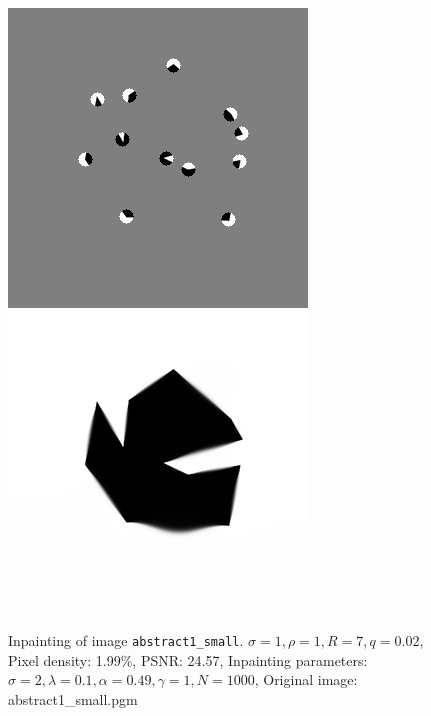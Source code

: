 \begin{figure}[ht]
    \centering
    \vspace*{0.2cm}
    \includegraphics[width=0.4\linewidth]{../Images/abstract/abstract1_small-mask_larger_radius.png}\hspace{0.2cm}
    \includegraphics[width=0.4\linewidth]{../Images/abstract/abstract1_small-inpaint_larger_radius.png}
    \caption{Inpainting of image \texttt{abstract1\_small}. $\sigma=1,\rho=1,R=7,q=0.02$, Pixel
        density: 1.99\%, PSNR: 24.57, Inpainting parameters:
        $\sigma=2,\lambda=0.1,\alpha=0.49,\gamma=1,N=1000$, Original image: abstract1\_small.pgm
}\label{fig:AbstractInpainting}
\end{figure}
